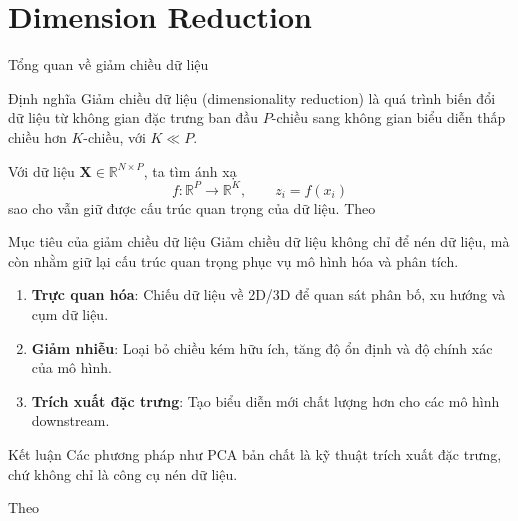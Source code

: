 \section{Dimension Reduction}

\begin{frame}{Tổng quan về giảm chiều dữ liệu}
	\begin{block}{Định nghĩa}
		Giảm chiều dữ liệu (dimensionality reduction) là quá trình biến đổi dữ liệu từ không gian đặc trưng ban đầu $P$-chiều
		sang không gian biểu diễn thấp chiều hơn $K$-chiều, với $K \ll P$.
	\end{block}

	\vspace{1em}

	Với dữ liệu $\mathbf{X} \in \mathbb{R}^{N \times P}$, ta tìm ánh xạ
	\[
		f: \mathbb{R}^{P} \rightarrow \mathbb{R}^{K}, \qquad z_i = f(x_i)
	\]
	sao cho vẫn giữ được cấu trúc quan trọng của dữ liệu.
	\hfill{\scriptsize Theo \cite{duchesnay2021statsml}}
\end{frame}
\begin{frame}{Mục tiêu của giảm chiều dữ liệu}
    Giảm chiều dữ liệu không chỉ để nén dữ liệu, mà còn nhằm giữ lại cấu trúc quan trọng
    phục vụ mô hình hóa và phân tích.

    \vspace{0.6em}
    \begin{enumerate}
        \item \textbf{Trực quan hóa}: Chiếu dữ liệu về 2D/3D để quan sát phân bố, xu hướng và cụm dữ liệu.
        \item \textbf{Giảm nhiễu}: Loại bỏ chiều kém hữu ích, tăng độ ổn định và độ chính xác của mô hình.
        \item \textbf{Trích xuất đặc trưng}: Tạo biểu diễn mới chất lượng hơn cho các mô hình downstream.
    \end{enumerate}

    \vspace{0.4em}
    \begin{block}{Kết luận}
        Các phương pháp như PCA bản chất là kỹ thuật trích xuất đặc trưng, chứ không chỉ là công cụ nén dữ liệu.
    \end{block}

    \hfill{\scriptsize Theo \cite{duchesnay2021statsml}}
\end{frame}
